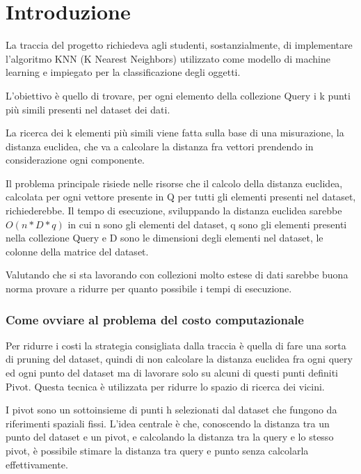 \maketitle
\chapter {Introduzione}
La traccia del progetto richiedeva agli studenti, sostanzialmente, di implementare l'algoritmo KNN (K Nearest Neighbors) utilizzato come modello di machine learning e impiegato per la classificazione degli oggetti.

L'obiettivo è quello di trovare, per ogni elemento della collezione Query i k punti più simili presenti nel dataset dei dati. 

La ricerca dei k elementi più simili viene fatta sulla base di una misurazione, la distanza euclidea, che va a calcolare la distanza fra vettori prendendo in considerazione ogni componente.

Il problema principale risiede nelle risorse che il calcolo della distanza euclidea, calcolata per ogni vettore presente in Q per tutti gli elementi presenti nel dataset, richiederebbe. Il tempo di esecuzione, sviluppando la distanza euclidea sarebbe $O(n*D*q)$ in cui n sono gli elementi del dataset, q sono gli elementi presenti nella collezione Query e D sono le dimensioni degli elementi nel dataset, le colonne della matrice del dataset. 

Valutando che si sta lavorando con collezioni molto estese di dati sarebbe buona norma provare a ridurre per quanto possibile i tempi di esecuzione.

\subsection{Come ovviare al problema del costo computazionale}
Per ridurre i costi la strategia consigliata dalla traccia è quella di fare una sorta di pruning del dataset, quindi di non calcolare la distanza euclidea fra ogni query ed ogni punto del dataset ma di lavorare solo su alcuni di questi punti definiti Pivot. Questa tecnica è utilizzata per ridurre lo spazio di ricerca dei vicini.

I pivot sono un sottoinsieme di punti h selezionati dal dataset che fungono da riferimenti spaziali fissi. L'idea centrale è che, conoscendo la distanza tra un punto del dataset e un pivot, e calcolando la distanza tra la query e lo stesso pivot, è possibile stimare la distanza tra query e punto senza calcolarla effettivamente.

